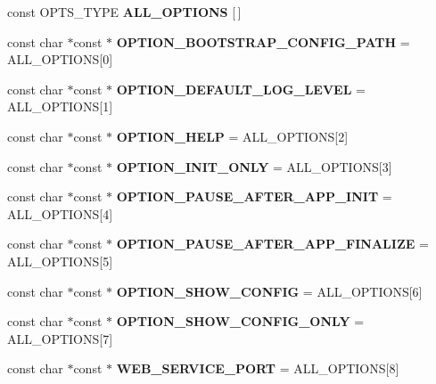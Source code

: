\begin{DoxyCompactItemize}
const O\+P\+T\+S\+\_\+\+T\+Y\+PE {\bfseries A\+L\+L\+\_\+\+O\+P\+T\+I\+O\+NS} \mbox{[}$\,$\mbox{]}
\item 
\mbox{\label{namespacetheoria_aeadced67d3add9b0a162608928227f19}} 
const char $\ast$const  $\ast$ {\bfseries O\+P\+T\+I\+O\+N\+\_\+\+B\+O\+O\+T\+S\+T\+R\+A\+P\+\_\+\+C\+O\+N\+F\+I\+G\+\_\+\+P\+A\+TH} = A\+L\+L\+\_\+\+O\+P\+T\+I\+O\+NS\mbox{[}0\mbox{]}
\item 
\mbox{\label{namespacetheoria_aeeb123cfbbdf0d865c7a235a200ffcc1}} 
const char $\ast$const  $\ast$ {\bfseries O\+P\+T\+I\+O\+N\+\_\+\+D\+E\+F\+A\+U\+L\+T\+\_\+\+L\+O\+G\+\_\+\+L\+E\+V\+EL} = A\+L\+L\+\_\+\+O\+P\+T\+I\+O\+NS\mbox{[}1\mbox{]}
\item 
\mbox{\label{namespacetheoria_a01dafa27a6256ef701e8129fd6755927}} 
const char $\ast$const  $\ast$ {\bfseries O\+P\+T\+I\+O\+N\+\_\+\+H\+E\+LP} = A\+L\+L\+\_\+\+O\+P\+T\+I\+O\+NS\mbox{[}2\mbox{]}
\item 
\mbox{\label{namespacetheoria_a29159304325e0d7dad9dbed4d1edba51}} 
const char $\ast$const  $\ast$ {\bfseries O\+P\+T\+I\+O\+N\+\_\+\+I\+N\+I\+T\+\_\+\+O\+N\+LY} = A\+L\+L\+\_\+\+O\+P\+T\+I\+O\+NS\mbox{[}3\mbox{]}
\item 
\mbox{\label{namespacetheoria_a845dc188b3c4a214d3d8f498c319f398}} 
const char $\ast$const  $\ast$ {\bfseries O\+P\+T\+I\+O\+N\+\_\+\+P\+A\+U\+S\+E\+\_\+\+A\+F\+T\+E\+R\+\_\+\+A\+P\+P\+\_\+\+I\+N\+IT} = A\+L\+L\+\_\+\+O\+P\+T\+I\+O\+NS\mbox{[}4\mbox{]}
\item 
\mbox{\label{namespacetheoria_a7099617a2180fe82d1171ec9b0d6cc4c}} 
const char $\ast$const  $\ast$ {\bfseries O\+P\+T\+I\+O\+N\+\_\+\+P\+A\+U\+S\+E\+\_\+\+A\+F\+T\+E\+R\+\_\+\+A\+P\+P\+\_\+\+F\+I\+N\+A\+L\+I\+ZE} = A\+L\+L\+\_\+\+O\+P\+T\+I\+O\+NS\mbox{[}5\mbox{]}
\item 
\mbox{\label{namespacetheoria_a941d5a7684d11181cab0a75afbd66139}} 
const char $\ast$const  $\ast$ {\bfseries O\+P\+T\+I\+O\+N\+\_\+\+S\+H\+O\+W\+\_\+\+C\+O\+N\+F\+IG} = A\+L\+L\+\_\+\+O\+P\+T\+I\+O\+NS\mbox{[}6\mbox{]}
\item 
\mbox{\label{namespacetheoria_ac0ab2a48f89fcaf37a68aeb173bc6506}} 
const char $\ast$const  $\ast$ {\bfseries O\+P\+T\+I\+O\+N\+\_\+\+S\+H\+O\+W\+\_\+\+C\+O\+N\+F\+I\+G\+\_\+\+O\+N\+LY} = A\+L\+L\+\_\+\+O\+P\+T\+I\+O\+NS\mbox{[}7\mbox{]}
\item 
\mbox{\label{namespacetheoria_a12fddb10230df9c3b7d3223104ab9f98}} 
const char $\ast$const  $\ast$ {\bfseries W\+E\+B\+\_\+\+S\+E\+R\+V\+I\+C\+E\+\_\+\+P\+O\+RT} = A\+L\+L\+\_\+\+O\+P\+T\+I\+O\+NS\mbox{[}8\mbox{]}
\end{DoxyCompactItemize}


